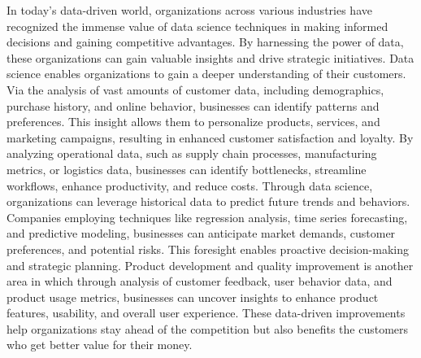 \documentclass{vgtc}                          %
\begin{document}
In today's data-driven world, organizations across various industries have recognized the immense value of data science techniques in making informed decisions 
and gaining competitive advantages. By harnessing the power of data, these organizations can gain valuable insights and drive strategic initiatives. Data science 
enables organizations to gain a deeper understanding of their customers. Via the analysis of vast amounts of customer data, including demographics, purchase history, and 
online behavior, businesses can identify patterns and preferences. This insight allows them to personalize products, services, and marketing campaigns, resulting in 
enhanced customer satisfaction and loyalty. By analyzing operational data, such as supply chain processes, manufacturing metrics, or logistics data, businesses can 
identify bottlenecks, streamline workflows, enhance productivity, and reduce costs. Through data science, organizations can leverage historical data to predict future 
trends and behaviors. Companies employing techniques like regression analysis, time series forecasting, and predictive modeling, businesses can anticipate market demands, 
customer preferences, and potential risks. This foresight enables proactive decision-making and strategic planning. Product development and quality improvement is another 
area in which through analysis of customer feedback, user behavior data, and product usage metrics, businesses can uncover insights to enhance product features, usability, 
and overall user experience. These data-driven improvements help organizations stay ahead of the competition but also benefits the customers who get better value for their money.\newline
\end{document}
